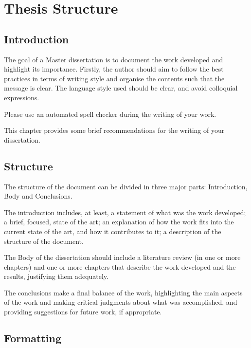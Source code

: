 % 
\chapter{Thesis Structure} %
\label{chap:Chapter1} %


%
\section{Introduction} 
\label{sec:chap1_introduction} %

The goal of a Master dissertation is to document the work developed and highlight its importance. Firstly, the author should aim to follow the best practices in terms of writing style and organise the contents such that the message is clear. The language style used should be clear, and avoid colloquial expressions.

Please use an automated spell checker during the writing of your work.

This chapter provides some brief recommendations for the writing of your dissertation. 

\section{Structure}

The structure of the document can be divided in three major parts: Introduction, Body and Conclusions.

The introduction includes, at least, a statement of what was the work developed; a brief, focused, state of the art; an explanation of how the work fits into the current state of the art, and how it contributes to it; a description of the structure of the document.

The Body of the dissertation should include a literature review (in one or more chapters) and one or more chapters that describe the work developed and the results, justifying them adequately.

The conclusions make a final balance of the work, highlighting the main aspects of the work and making critical judgments about what was accomplished, and providing suggestions for future work, if appropriate. 

\section{Formatting}

